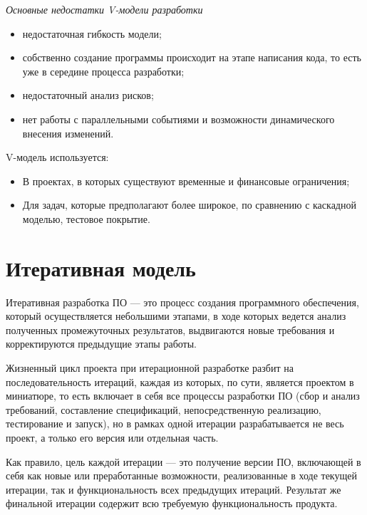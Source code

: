 \documentclass[a4paper,14pt]{extarticle}
\begin{document}
 	\textit{Основные недостатки V-модели разработки}
 	\begin{itemize}
 		\item недостаточная гибкость модели;
 		
 		\item собственно создание программы происходит на этапе написания кода, то есть уже в середине процесса разработки;
 		
 		\item недостаточный анализ рисков;
 		
 		\item нет работы с параллельными событиями и возможности динамического внесения изменений.
 	\end{itemize}
 
 	V-модель используется:
 	\begin{itemize}
 		\item В проектах, в которых существуют временные и финансовые ограничения;
 		
 		\item Для задач, которые предполагают более широкое, по сравнению с каскадной моделью, тестовое покрытие.
 	\end{itemize}
 	
 	\section{Итеративная модель}
 	
 	Итеративная разработка ПО — это процесс создания программного обеспечения, который осуществляется небольшими этапами, в ходе которых ведется анализ полученных промежуточных результатов, выдвигаются новые требования и корректируются предыдущие этапы работы.
 	
 	Жизненный цикл проекта при итерационной разработке разбит на последовательность итераций, каждая из которых, по сути, является проектом в миниатюре, то есть включает в себя все процессы разработки ПО (сбор и анализ требований, составление спецификаций, непосредственную реализацию, тестирование и запуск), но в рамках одной итерации разрабатывается не весь проект, а только его версия или отдельная часть.
 	
 	Как правило, цель каждой итерации — это получение версии ПО, включающей в себя как новые или преработанные возможности, реализованные в ходе текущей итерации, так и функциональность всех предыдущих итераций. Результат же финальной итерации содержит всю требуемую функциональность продукта.
 	
\end{document}
